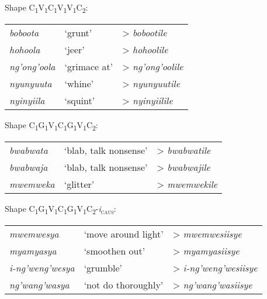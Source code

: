 \begin{exe}
\ex Shape C\textsubscript{1}V\textsubscript{1}C\textsubscript{1}V\textsubscript{1}V\textsubscript{1}C\textsubscript{2}:
\\\begin{tabular}[t]{@{}>{\itshape}lll}
\textit{boboota}&`grunt'& > \textit{bobootile}
\\\textit{hohoola}&`jeer'& > \textit{hohoolile}
\\\textit{ng'ong'oola}&`grimace at'& > \textit{ng'ong'oolile}
\\\textit{nyunyuuta}&`whine'& > \textit{nyunyuutile}
\\\textit{nyinyiila}&`squint'& > \textit{nyinyiilile}
\end{tabular}
\ex Shape C\textsubscript{1}G\textsubscript{1}V\textsubscript{1}C\textsubscript{1}G\textsubscript{1}V\textsubscript{1}C\textsubscript{2}:
\\\begin{tabular}[t]{@{}>{\itshape}lll}
\textit{bwabwata}&`blab, talk nonsense'& > \textit{bwabwatile}
\\\textit{bwabwaja}&`blab, talk nonsense'& > \textit{bwabwajile}
\\\textit{mwemweka}&`glitter'& > \textit{mwemwekile}
\end{tabular}
\ex Shape C\textsubscript{1}G\textsubscript{1}V\textsubscript{1}C\textsubscript{1}G\textsubscript{1}V\textsubscript{1}C\textsubscript{2}-\textit{i}\textsubscript{\textsc{caus}}:
\\\begin{tabular}[t]{@{}>{\itshape}lll}
\textit{mwemwesya}&`move around light'& > \textit{mwemwesiisye}
\\\textit{myamyasya}&`smoothen out'& > \textit{myamyasiisye}
\\\textit{i-ng'weng'wesya}&`grumble'& > \textit{i-ng'weng'wesiisye}
\\\textit{ng'wang'wasya}&`not do thoroughly'& > \textit{ng'wang'wasiisye}
\end{tabular}
\end{exe}

\label{PastNonPast}

